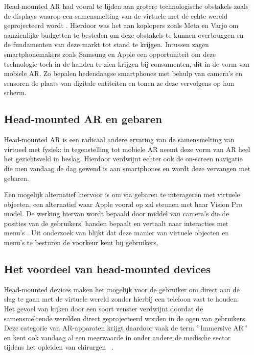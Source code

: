 Head-mounted AR had vooral te lijden aan grotere technologische obstakels zoals de displays waarop een samensmelting van de virtuele met de echte wereld geprojecteerd wordt \autocite{YunHan2019} .
Hierdoor was het aan koplopers zoals Meta en Varjo om aanzienlijke budgetten te besteden om deze obstakels te kunnen overbruggen en de fundamenten van deze markt tot stand te krijgen. %
Intussen zagen smartphonemakers zoals Samsung en Apple een opportuniteit om deze technologie toch in de handen te zien krijgen bij consumenten, dit in de vorm van mobiele AR.
Zo bepalen hedendaagse smartphones met behulp van camera's en sensoren de plaats van digitale entiteiten en tonen ze deze vervolgens op hun scherm.

\subsection{Head-mounted AR en gebaren}
\label{subsec:ar-gestures}
Head-mounted AR is een radicaal andere ervaring van de samensmelting van virtueel met fysiek: in tegenstelling tot mobiele AR neemt deze vorm van AR heel het gezichtsveld in beslag.
Hierdoor verdwijnt echter ook de on-screen navigatie die men vandaag de dag gewend is aan smartphones en wordt deze vervangen met gebaren.

Een mogelijk alternatief hiervoor is om via gebaren te interageren met virtuele objecten, een alternatief waar Apple vooral op zal steunen met haar Vision Pro model.
De werking hiervan wordt bepaald door middel van camera's die de posities van de gebruikers' handen bepaalt en vertaalt naar interacties met menu's \textcite{Shrestha2018} .
Uit onderzoek van \textcite{Datcu2013} blijkt dat deze manier van virtuele objecten en menu's te besturen de voorkeur kent bij gebruikers.

\subsection{Het voordeel van head-mounted devices}
\label{subsec:benefits-hmd}
Head-mounted devices maken het mogelijk voor de gebruiker om direct aan de slag te gaan met de virtuele wereld zonder hierbij een telefoon vast te houden.
Het gevoel van kijken door een soort venster verdwijnt doordat de samensmeltende werelden direct geprojecteerd worden in de ogen van gebruikers.
Deze categorie van AR-apparaten krijgt daardoor vaak de term \("\)Immersive AR\("\) en kent ook vandaag al een meerwaarde in onder andere de medische sector tijdens het opleiden van chirurgen~\autocite{Waisberg2023} .

